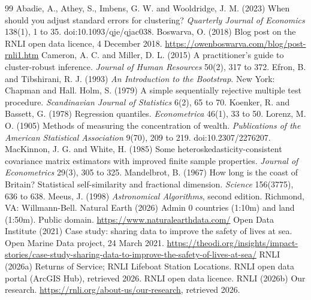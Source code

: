 \documentclass[11pt,a4paper]{article}
\begin{document}
\begin{thebibliography}{99}
 Abadie, A., Athey, S., Imbens, G. W. and Wooldridge, J. M. (2023) When should you adjust standard errors for clustering? \textit{Quarterly Journal of Economics} 138(1), 1 to 35. doi:10.1093/qje/qjac038.
 Boswarva, O. (2018) Blog post on the RNLI open data licence, 4 December 2018. \url{https://owenboswarva.com/blog/post-rnli1.htm}
 Cameron, A. C. and Miller, D. L. (2015) A practitioner's guide to cluster-robust inference. \textit{Journal of Human Resources} 50(2), 317 to 372.
 Efron, B. and Tibshirani, R. J. (1993) \textit{An Introduction to the Bootstrap}. New York: Chapman and Hall.
 Holm, S. (1979) A simple sequentially rejective multiple test procedure. \textit{Scandinavian Journal of Statistics} 6(2), 65 to 70.
 Koenker, R. and Bassett, G. (1978) Regression quantiles. \textit{Econometrica} 46(1), 33 to 50.
 Lorenz, M. O. (1905) Methods of measuring the concentration of wealth. \textit{Publications of the American Statistical Association} 9(70), 209 to 219. doi:10.2307/2276207.
 MacKinnon, J. G. and White, H. (1985) Some heteroskedasticity-consistent covariance matrix estimators with improved finite sample properties. \textit{Journal of Econometrics} 29(3), 305 to 325.
 Mandelbrot, B. (1967) How long is the coast of Britain? Statistical self-similarity and fractional dimension. \textit{Science} 156(3775), 636 to 638.
 Meeus, J. (1998) \textit{Astronomical Algorithms}, second edition. Richmond, VA: Willmann-Bell.
 Natural Earth (2026) Admin 0 countries (1:10m) and land (1:50m). Public domain. \url{https://www.naturalearthdata.com/}
 Open Data Institute (2021) Case study: sharing data to improve the safety of lives at sea. Open Marine Data project, 24 March 2021. \url{https://theodi.org/insights/impact-stories/case-study-sharing-data-to-improve-the-safety-of-lives-at-sea/}
 RNLI (2026a) Returns of Service; RNLI Lifeboat Station Locations. RNLI open data portal (ArcGIS Hub), retrieved 2026. RNLI open data licence.
 RNLI (2026b) Our research. \url{https://rnli.org/about-us/our-research}, retrieved 2026.

\end{thebibliography}
\end{document}
